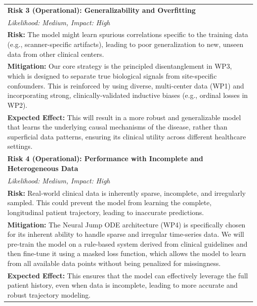 \documentclass[11pt, a4paper]{article}
\begin{document}
\begin{longtable}{p{}}
\textbf{Risk 3 (Operational): Generalizability and Overfitting} \\
\textit{Likelihood: Medium, Impact: High} \\
\textbf{Risk:} The model might learn spurious correlations specific to the training data (e.g., scanner-specific artifacts), leading to poor generalization to new, unseen data from other clinical centers. \\
\textbf{Mitigation:} Our core strategy is the principled disentanglement in WP3, which is designed to separate true biological signals from site-specific confounders. This is reinforced by using diverse, multi-center data (WP1) and incorporating strong, clinically-validated inductive biases (e.g., ordinal losses in WP2). \\
\textbf{Expected Effect:} This will result in a more robust and generalizable model that learns the underlying causal mechanisms of the disease, rather than superficial data patterns, ensuring its clinical utility across different healthcare settings. \\
\addlinespace

\textbf{Risk 4 (Operational): Performance with Incomplete and Heterogeneous Data} \\
\textit{Likelihood: Medium, Impact: High}\\
\textbf{Risk:} Real-world clinical data is inherently sparse, incomplete, and irregularly sampled. This could prevent the model from learning the complete, longitudinal patient trajectory, leading to inaccurate predictions. \\
\textbf{Mitigation:} The Neural Jump ODE architecture (WP4) is specifically chosen for its inherent ability to handle sparse and irregular time-series data. We will pre-train the model on a rule-based system derived from clinical guidelines and then fine-tune it using a masked loss function, which allows the model to learn from all available data points without being penalized for missingness. \\
\textbf{Expected Effect:} This ensures that the model can effectively leverage the full patient history, even when data is incomplete, leading to more accurate and robust trajectory modeling. \\


\end{longtable}
\end{document}
